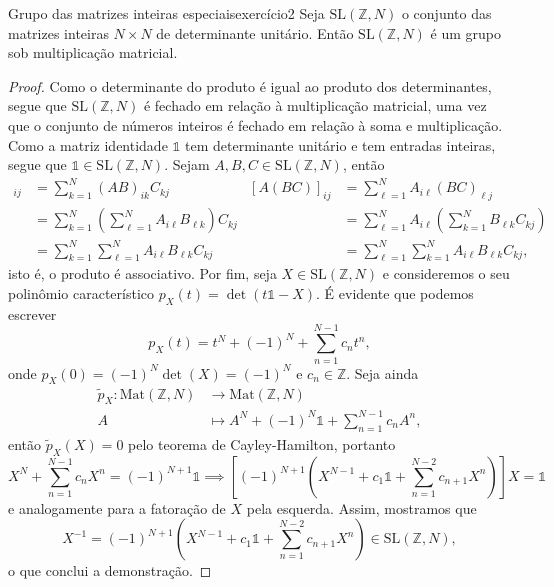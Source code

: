 \begin{exercício}{Grupo das matrizes inteiras especiais}{exercício2}
    Seja \(\mathrm{SL}(\mathbb{Z}, N)\) o conjunto das matrizes inteiras \(N \times N\) de determinante unitário. Então \(\mathrm{SL}(\mathbb{Z}, N)\) é um grupo sob multiplicação matricial.
\end{exercício}
\begin{proof}
    Como o determinante do produto é igual ao produto dos determinantes, segue que \(\mathrm{SL}(\mathbb{Z}, N)\) é fechado em relação à multiplicação matricial, uma vez que o conjunto de números inteiros é fechado em relação à soma e multiplicação. Como a matriz identidade \(\mathds{1}\) tem determinante unitário e tem entradas inteiras, segue que \(\mathds{1} \in \mathrm{SL}(\mathbb{Z}, N)\). Sejam \(A, B, C \in \mathrm{SL}(\mathbb{Z}, N)\), então
    \begin{align*}
        [(AB)C]_{ij} &= \sum_{k = 1}^N (AB)_{ik} C_{kj}&
        [A(BC)]_{ij} &= \sum_{\ell = 1}^N A_{i\ell} (BC)_{\ell j}\\
                     &= \sum_{k = 1}^N \left(\sum_{\ell = 1}^N A_{i\ell}B_{\ell k}\right) C_{kj}&
                     &= \sum_{\ell = 1}^N A_{i\ell}\left(\sum_{k = 1}^N B_{\ell k} C_{k j}\right)\\
                     &= \sum_{k = 1}^N \sum_{\ell = 1}^N A_{i\ell} B_{\ell k} C_{kj}&
                     &= \sum_{\ell = 1}^N \sum_{k = 1}^N A_{i\ell} B_{\ell k} C_{k j},
    \end{align*}
    isto é, o produto é associativo. Por fim, seja \(X \in \mathrm{SL}(\mathbb{Z}, N)\) e consideremos o seu polinômio característico \(p_X(t) = \det(t \mathds{1} - X)\). É evidente que podemos escrever
    \begin{equation*}
        p_X(t) = t^N + (-1)^N + \sum_{n=1}^{N-1} c_n t^{n},
    \end{equation*}
    onde \(p_X(0) = (-1)^N\det(X) = (-1)^N\) e \(c_n \in \mathbb{Z}\). Seja ainda
    \begin{align*}
        \tilde{p}_X : \mathrm{Mat}(\mathbb{Z}, N) &\to \mathrm{Mat}(\mathbb{Z}, N)\\
        A &\mapsto A^N + (-1)^N \mathds{1} + \sum_{n=1}^{N-1} c_n A^n,
    \end{align*}
    então \(\tilde{p}_X(X) = 0\) pelo teorema de Cayley-Hamilton, portanto
    \begin{equation*}
        X^N + \sum_{n = 1}^{N-1} c_n X^n = (-1)^{N+1} \mathds{1} \implies \left[(-1)^{N+1} \left(X^{N-1} + c_1 \mathds{1} + \sum_{n=1}^{N-2} c_{n+1} X^{n}\right)\right]X = \mathds{1}
    \end{equation*}
    e analogamente para a fatoração de \(X\) pela esquerda. Assim, mostramos que
    \begin{equation*}
        X^{-1} = (-1)^{N+1} \left(X^{N-1} + c_1 \mathds{1} + \sum_{n=1}^{N-2} c_{n+1} X^{n}\right) \in \mathrm{SL}(\mathbb{Z}, N),
    \end{equation*}
    o que conclui a demonstração.
\end{proof}
